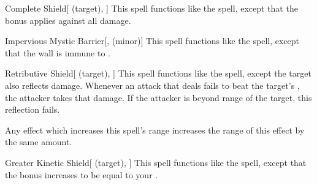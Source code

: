 \lowercase{\hypertarget{spell:Complete Shield}{}}\label{spell:Complete Shield}
\begin{attuneability}[Rank 6]{\hypertarget{spell:Complete Shield}{Complete Shield}}[ (target), ]
This spell functions like the  spell, except that the bonus applies against all damage.
\end{attuneability}
\vspace{0.25em}



\lowercase{\hypertarget{spell:Impervious Mystic Barrier}{}}\label{spell:Impervious Mystic Barrier}
\begin{freeability}[Rank 6]{\hypertarget{spell:Impervious Mystic Barrier}{Impervious Mystic Barrier}}[,  (minor)]
\targetrule
This spell functions like the  spell, except that the wall is immune to .
\end{freeability}
\vspace{0.25em}



\lowercase{\hypertarget{spell:Retributive Shield}{}}\label{spell:Retributive Shield}
\begin{attuneability}[Rank 6]{\hypertarget{spell:Retributive Shield}{Retributive Shield}}[ (target), ]
This spell functions like the  spell, except the target also reflects damage.
Whenever an attack that deals  fails to beat the target's , the attacker takes that damage.
If the attacker is beyond \rngclose range of the target, this reflection fails.

Any effect which increases this spell's range increases the range of this effect by the same amount.
\end{attuneability}
\vspace{0.25em}



\lowercase{\hypertarget{spell:Greater Kinetic Shield}{}}\label{spell:Greater Kinetic Shield}
\begin{attuneability}[Rank 7]{\hypertarget{spell:Greater Kinetic Shield}{Greater Kinetic Shield}}[ (target), ]
This spell functions like the  spell, except that the bonus increases to be equal to your .
\end{attuneability}
\vspace{0.25em}



